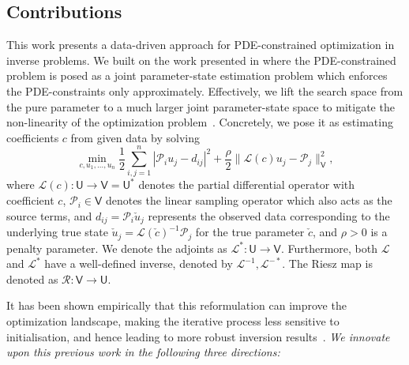 \documentclass[12pt]{amsart}
\newcommand{\V}{\mathsf{V}}
\begin{document}
\subsection{Contributions}
This work presents a data-driven approach for PDE-constrained optimization in inverse problems. We built on the work presented in \cite{van2015penalty} where the PDE-constrained problem is posed as a joint parameter-state estimation problem which enforces the PDE-constraints only approximately. Effectively, we lift the search space from the pure parameter to a much larger joint parameter-state space to mitigate the non-linearity of the optimization problem~\cite{fang2020lift}. Concretely, we pose it as estimating coefficients $c$ from given data by solving
\begin{equation}\label{eq:intro}
\min_{c,u_1, \ldots, u_n} {\textstyle{\frac{1}{2}}}\sum_{i,j=1}^n |\mathcal{P}_iu_j - d_{ij}|^2 +  {\textstyle{\frac{\rho}{2}}}\|\mathcal{L}(c)u_j - \mathcal{P}_j\|_\mathsf{V}^2,
\end{equation}
where $\mathcal{L}(c):\mathsf{U}\rightarrow\mathsf{V} = \mathsf{U}^*$ denotes the partial differential operator with coefficient $c$, $\mathcal{P}_i\in \V$ denotes the linear sampling operator which also acts as the source terms, and $d_{ij} = \mathcal{P}_i\check{u}_j$ represents the observed data corresponding to the underlying true state $\check{u}_j = \mathcal{L}(\check{c})^{-1}\mathcal{P}_j$ for the true parameter $\check{c}$, and $\rho > 0$ is a penalty parameter. We denote the adjoints as $\mathcal{L}^* : \mathsf{U}\rightarrow\mathsf{V}$. Furthermore, both $\mathcal{L}$ and $\mathcal{L}^*$ have a well-defined inverse, denoted by $\mathcal{L}^{-1}, \mathcal{L}^{-*}$. The Riesz map is denoted as $\mathcal{R}:\mathsf{V}\rightarrow\mathsf{U}$.

It has been shown empirically that this reformulation can improve the optimization landscape, making the iterative process less sensitive to initialisation, and hence leading to more robust inversion results~\cite{van2015penalty}. \emph{We innovate upon this previous work in the following three directions:}
\end{document}
